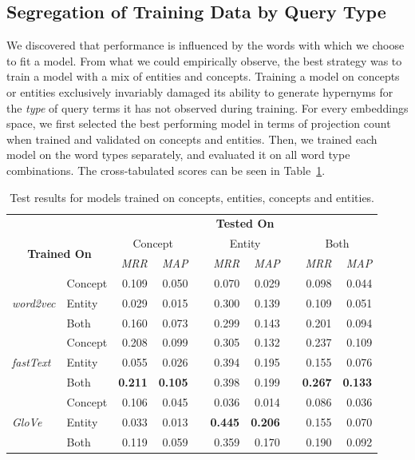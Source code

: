 \subsection{Segregation of Training Data by Query Type}
We discovered that performance is influenced by the words with which we choose to fit a model.  From what we could empirically observe, the best strategy was to train a model with a mix of entities and concepts.  Training a model on concepts or entities exclusively invariably damaged its ability to generate hypernyms for the \textit{type} of query terms it has not observed during training.  For every embeddings space, we first selected the best performing model in terms of projection count when trained and validated on concepts and entities.  Then, we trained each model on the word types separately, and evaluated it on all word type combinations.  The cross-tabulated scores can be seen in Table~\ref{tab:semeval_wordtype_results}.
\begin{table}\centering
\begin{tabular}{@{}llrrcrrcrr@{}}\toprule
& & \multicolumn{8}{c}{\textbf{Tested On}}\\ 
\cmidrule{3-10}
\multicolumn{2}{c}{\multirow[c]{2}{*}{\textbf{Trained On}}} & \multicolumn{2}{c}{Concept} & \phantom{a} & \multicolumn{2}{c}{Entity} & \phantom{a} & \multicolumn{2}{c}{Both}\\ 
\multicolumn{2}{c}{} & \textit{MRR} & \textit{MAP} && \textit{MRR} & \textit{MAP} && \textit{MRR} & \textit{MAP}\\
\cmidrule{3-4} \cmidrule{6-7} \cmidrule{9-10}  
\multirow{3}{*}{\textit{word2vec}} 
& Concept & 0.109 & 0.050 && 0.070 & 0.029 && 0.098 & 0.044\\
& Entity & 0.029 & 0.015 && 0.300 & 0.139 && 0.109 & 0.051\\
& Both & 0.160 & 0.073 && 0.299 & 0.143 && 0.201 & 0.094 \\ \midrule

\multirow{3}{*}{\textit{fastText}} 
& Concept & 0.208 & 0.099 && 0.305 & 0.132 && 0.237 & 0.109\\
& Entity & 0.055 & 0.026 && 0.394 & 0.195 && 0.155 & 0.076\\
& Both & \textbf{0.211} & \textbf{0.105} && 0.398 & 0.199 && \textbf{0.267} & \textbf{0.133}\\ \midrule

\multirow{3}{*}{\textit{GloVe}} 
& Concept & 0.106 & 0.045 && 0.036 & 0.014 && 0.086 & 0.036 \\
& Entity & 0.033 & 0.013 && \textbf{0.445} & \textbf{0.206} && 0.155 & 0.070 \\
& Both & 0.119 & 0.059 && 0.359 & 0.170 && 0.190 & 0.092\\ 
\bottomrule
\end{tabular}
\caption{Test results for models trained on concepts, entities, concepts and entities.}\label{tab:semeval_wordtype_results}
\end{table}

